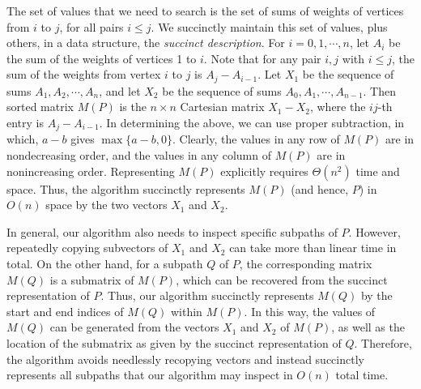\documentclass [12pt]{article}
\begin{document}
The set of values that we need to search is the set of sums of weights of vertices from $i$ to $j$, for all pairs $i\leq j$. 
We succinctly maintain this set of values, plus others, in a data structure, the \emph{succinct description}. 
For $i=0,1, \cdots ,n$, let $A_i$ be the sum of the weights of vertices 1 to $i$.
Note that for any pair $i,j$ with $i \leq j$, the sum of the weights from vertex $i$ to $j$ is $A_j - A_{i-1}$.
Let $X_1$ be the sequence of sums $A_1, A_2, \cdots ,A_n$, and let $X_2$ be the sequence of sums $A_0, A_1, \cdots ,A_{n-1}$.
Then sorted matrix $M(P)$ is the $n \times n$ Cartesian matrix $X_1-X_2$, where the $ij$-th entry is $A_j-A_{i-1}$.
In determining the above, we can use proper subtraction, in which, $a-b$ gives $\max \{a-b,0\}$.
Clearly, the values in any row of $M(P)$ are in nondecreasing order, and the values in any column of $M(P)$ are in nonincreasing order. 
Representing $M(P)$ explicitly requires $\Theta(n^2)$ time and space. 
Thus, the algorithm succinctly represents $M(P)$ (and hence, $P$) in $O(n)$ space by the two vectors $X_1$ and $X_2$. 

In general, our algorithm also needs to inspect specific subpaths of $P$. 
However, repeatedly copying subvectors of $X_1$ and $X_2$ can take more than linear time in total. 
On the other hand, for a subpath $Q$ of $P$, the corresponding matrix $M(Q)$ is a submatrix of $M(P)$, which can be recovered from the succinct representation of $P$. 
Thus, our algorithm succinctly represents $M(Q)$ by the start and end indices of $M(Q)$ within $M(P)$. 
In this way, the values of $M(Q)$ can be generated from the vectors $X_1$ and $X_2$ of $M(P)$, as well as the location of the submatrix as given by the succinct representation of $Q$. 
Therefore, the algorithm avoids needlessly recopying vectors and instead succinctly represents all subpaths that our algorithm may inspect in $O(n)$ total time.
\end{document}
